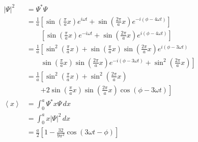 \documentclass{article}
\newcommand{\ev}[1]{\left< #1 \right>}
\begin{document}
\begin{align*}
  |\Psi|^2 & = \Psi^* \Psi                                                                                                                                                            \\
           & = \frac{1}{a} \left[ \sin \left( \frac{\pi}{a} x \right) e^{i \omega t} + \sin \left( \frac{2 \pi}{a} x \right) e^{-i (\phi - 4 \omega t)} \right]                       \\
           & \qquad \left[ \sin \left( \frac{\pi}{a} x \right) e^{-i \omega t} + \sin \left( \frac{2 \pi}{a} x \right) e^{i (\phi - 4 \omega t)} \right]                              \\
           & = \frac{1}{a} \left[ \sin^2 \left( \frac{\pi}{a} x \right) + \sin \left( \frac{\pi}{a} x \right) \sin \left( \frac{2 \pi}{a} x \right) e^{i (\phi - 3 \omega t)} \right. \\
           & \qquad \left. \sin \left( \frac{\pi}{a} x \right) \sin \left( \frac{2 \pi}{a} x \right) e^{-i (\phi - 3 \omega t)} + \sin^2 \left( \frac{2 \pi}{a} x \right) \right]     \\
           & = \frac{1}{a} \left[ \sin^2 \left( \frac{\pi}{a} x \right) + \sin^2 \left( \frac{2 \pi}{a} x \right) \right.                                                             \\
           & \qquad \left. + 2 \sin \left( \frac{\pi}{a} x \right) \sin \left( \frac{2 \pi}{a} x \right) \cos (\phi - 3 \omega t) \right]                                             \\
  \ev{x}   & = \int_0^a \Psi^* x \Psi \,d x                                                                                                                                           \\
           & = \int_0^a x |\Psi|^2 \,d x                                                                                                                                              \\
           & = \frac{a}{2} \left[ 1 - \frac{32}{9 \pi^2} \cos (3 \omega t - \phi) \right]
\end{align*}

\subsection{}
\end{document}
